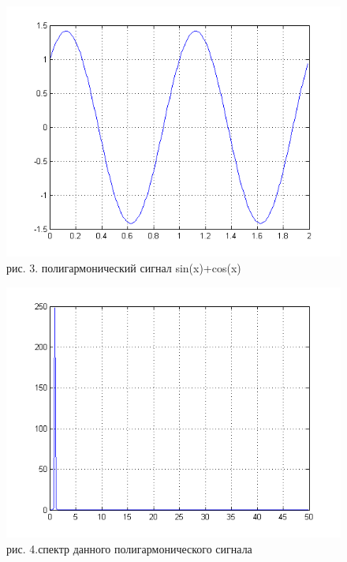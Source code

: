 \documentclass[10pt,a4paper]{report}
\begin{document}
\begin{figure}
\begin{center}
\includegraphics[angle=0, scale = 0.9]{12.png}\newline
рис. 3. полигармонический сигнал sin(x)+cos(x)\newline
\end{center}
\end{figure}
\begin{figure}
\begin{center}
\includegraphics[angle=0, scale = 0.9]{11.png}\newline
рис. 4.спектр данного полигармонического сигнала\newline
\end{center}
\end{figure}
\end{document}
